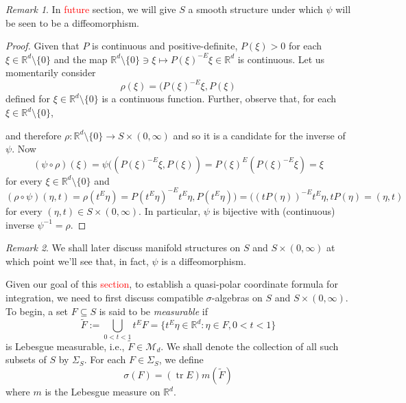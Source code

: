 \documentclass{article}
\theoremstyle{theorem}
\theoremstyle{remark}
\newtheorem{remark}{Remark}
\newcommand\tr{\operatorname{tr}}
\begin{document}
\begin{remark}
In \textcolor{red}{future} section, we will give $S$ a smooth structure under which $\psi$ will be seen to be a diffeomorphism.
\end{remark}

\begin{proof}
Given that $P$ is continuous and positive-definite, $P(\xi)>0$ for each $\xi\in \mathbb{R}^d\setminus\{0\}$ and the map $\mathbb{R}^d\setminus\{0\}\ni \xi \mapsto P(\xi)^{-E}\xi\in \mathbb{R}^d$ is continuous. Let us momentarily consider
\begin{equation*}
\rho(\xi)=(P(\xi)^{-E}\xi,P(\xi)
\end{equation*}
defined for $\xi\in\mathbb{R}^d\setminus\{0\}$ is a continuous function. Further, observe that, for each $\xi\in\mathbb{R}^d\setminus\{0\}$,

and therefore $\rho:\mathbb{R}^d\setminus\{0\}\to S\times (0,\infty)$ and so it is a candidate for the inverse of $\psi$. Now
\begin{equation*}
(\psi\circ \rho)(\xi)=\psi((P(\xi)^{-E}\xi,P(\xi))=P(\xi)^{E}(P(\xi)^{-E}\xi)=\xi
\end{equation*}
for every $\xi\in \mathbb{R}^d\setminus \{0\}$ and
\begin{equation*}
(\rho\circ\psi)(\eta,t)=\rho(t^E\eta)=P(t^{E}\eta)^{-E}t^{E}\eta,P(t^{E}\eta))=((tP(\eta))^{-E}t^E\eta,tP(\eta)=(\eta,t)
\end{equation*}
for every $(\eta,t)\in S\times (0,\infty)$. In particular, $\psi$ is bijective with (continuous) inverse $\psi^{-1}=\rho$. 
\end{proof}


\begin{remark}We shall later discuss manifold structures on $S$ and $S\times (0,\infty)$ at which point we'll see that, in fact, $\psi$ is a diffeomorphism.
\end{remark}

Given our goal of this \textcolor{red}{section}, to establish a quasi-polar coordinate formula for integration, we need to first discuss compatible $\sigma$-algebras on $S$ and $S\times (0,\infty)$. To begin, a set $F\subseteq S$ is said to be \textit{measurable} if
\begin{equation*}
\widetilde F:=\bigcup_{0<t<1}t^E F=\{t^E\eta\in\mathbb{R}^d:\eta\in F,0<t<1\}
\end{equation*}
is Lebesgue measurable, i.e., $\widetilde F\in \mathcal{M}_d$. We shall denote the collection of all such subsets of $S$ by $\Sigma_S$. \noindent For each $F\in \Sigma_S$, we define
\begin{equation*}
\sigma(F)=(\tr E) m(\widetilde F)
\end{equation*}
where $m$ is the Lebesgue measure on $\mathbb{R}^d$.
\end{document}
